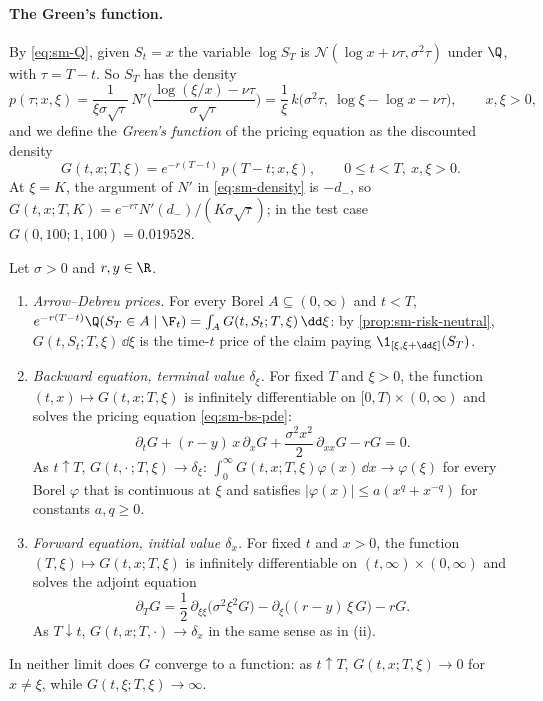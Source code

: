 \paragraph{The Green's function.} By \eqref{eq:sm-Q}, given $S_t=x$ the variable $\log S_T$ is
$\mathcal N(\log x+\nu\tau,\sigma^2\tau)$ under $\Q$, with $\tau=T-t$. So $S_T$ has the density
\begin{equation}\label{eq:sm-density}
  p(\tau;x,\xi)=\frac{1}{\xi\sigma\sqrt\tau}\,N'\Big(\frac{\log(\xi/x)-\nu\tau}{\sigma\sqrt\tau}\Big)
  =\frac1\xi\,k\big(\sigma^2\tau,\ \log\xi-\log x-\nu\tau\big),\qquad x,\xi>0,
\end{equation}
and we define the \emph{Green's function} of the pricing equation as the discounted density
\[
  G(t,x;T,\xi)=e^{-r(T-t)}\,p(T-t;x,\xi),\qquad 0\le t<T,\ x,\xi>0 .
\]
At $\xi=K$, the argument of $N'$ in \eqref{eq:sm-density} is $-d_-$, so
$G(t,x;T,K)=e^{-r\tau}N'(d_-)/(K\sigma\sqrt\tau)$; in the test case $G(0,100;1,100)=0.019528$.

\begin{proposition}\label{prop:sm-green}
Let $\sigma>0$ and $r,y\in\R$.
\begin{enumerate}[label=(\roman*)]
  \item \emph{Arrow--Debreu prices.} For every Borel $A\subseteq(0,\infty)$ and $t<T$,
    $e^{-r(T-t)}\Q(S_T\in A\mid\F_t)=\int_AG(t,S_t;T,\xi)\,\dd\xi$: by \cref{prop:sm-risk-neutral},
    $G(t,S_t;T,\xi)\,\dd\xi$ is the time-$t$ price of the claim paying $\1_{[\xi,\xi+\dd\xi]}(S_T)$.
  \item \emph{Backward equation, terminal value $\delta_\xi$.} For fixed $T$ and $\xi>0$, the
    function $(t,x)\mapsto G(t,x;T,\xi)$ is infinitely differentiable on $[0,T)\times(0,\infty)$ and
    solves the pricing equation \eqref{eq:sm-bs-pde}:
    \begin{equation}\label{eq:sm-backward}
      \partial_tG+(r-y)\,x\,\partial_xG+\frac{\sigma^2x^2}{2}\,\partial_{xx}G-rG=0 .
    \end{equation}
    As $t\uparrow T$, $G(t,\cdot\,;T,\xi)\to\delta_\xi$: $\int_0^\infty G(t,x;T,\xi)\varphi(x)\,\dd x\to\varphi(\xi)$
    for every Borel $\varphi$ that is continuous at $\xi$ and satisfies $|\varphi(x)|\le a(x^q+x^{-q})$
    for constants $a,q\ge0$.
  \item \emph{Forward equation, initial value $\delta_x$.} For fixed $t$ and $x>0$, the function
    $(T,\xi)\mapsto G(t,x;T,\xi)$ is infinitely differentiable on $(t,\infty)\times(0,\infty)$ and
    solves the adjoint equation
    \begin{equation}\label{eq:sm-forward}
      \partial_TG=\frac12\,\partial_{\xi\xi}\big(\sigma^2\xi^2G\big)-\partial_\xi\big((r-y)\,\xi\,G\big)-rG .
    \end{equation}
    As $T\downarrow t$, $G(t,x;T,\cdot)\to\delta_x$ in the same sense as in (ii).
\end{enumerate}
In neither limit does $G$ converge to a function: as $t\uparrow T$, $G(t,x;T,\xi)\to0$ for $x\ne\xi$,
while $G(t,\xi;T,\xi)\to\infty$.
\end{proposition}

